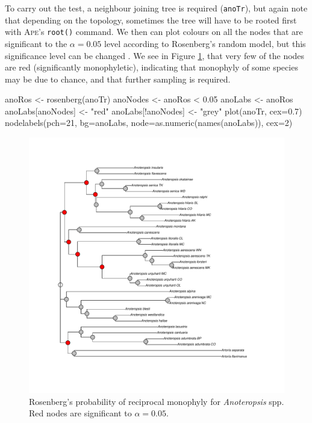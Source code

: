 \documentclass{article}
\newcommand{\progname}[1]{\textsc{#1}}
\newcommand{\fun}[1]{\texttt{#1}}
\begin{document}
To carry out the test, a neighbour joining tree is required (\fun{anoTr}), but again note that depending on the topology, sometimes the tree will have to be rooted first with \progname{Ape}'s \fun{root()} command. We then can plot colours on all the nodes that are significant to the $\alpha = 0.05$ level according to Rosenberg's random model, but this significance level can be changed \citep{Rosenberg2007}. We see in Figure \ref{rosenbergs.fig}, that very few of the nodes are red (significantly monophyletic), indicating that monophyly of some species may be due to chance, and that further sampling is required. 

\begin{console}
anoRos <- rosenberg(anoTr)
anoNodes <- anoRos < 0.05
anoLabs <- anoRos
anoLabs[anoNodes] <- "red"
anoLabs[!anoNodes] <- "grey"
plot(anoTr, cex=0.7)
nodelabels(pch=21, bg=anoLabs, node=as.numeric(names(anoLabs)), cex=2)
\end{console}

\begin{figure}[p]
	\centering
	\includegraphics[width=1\textwidth, trim=3cm 1cm 3cm 0cm]{rosenbergs}
	\caption{Rosenberg's probability of reciprocal monophyly for  \emph{Anoteropsis} spp. Red nodes are significant to $\alpha = 0.05$.}
	\label{rosenbergs.fig}
\end{figure}
\end{document}
